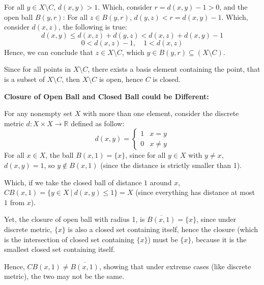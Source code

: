 \documentclass{article}
\begin{document}
For all $y\in X\setminus C$, $d(x,y)>1$. Which, consider $r=d(x,y)-1>0$, and the open ball $B(y,r)$:
For all $z\in B(y,r)$, $d(y,z) < r = d(x,y)-1$. Which, consider $d(x,z)$, the following is true:
$$d(x,y) \leq d(x,z)+d(y,z) < d(x,z)+d(x,y)-1$$
$$0 < d(x,z)-1,\quad 1<d(x,z)$$
Hence, we can conclude that $z\in X\setminus C$, which $y\in B(y,r)\subseteq (X\setminus C)$.

Since for all points in $X\setminus C$, there exists a basis element containing the point, that is a subset of $X\setminus C$,
then $X\setminus C$ is open, hence $C$ is closed.

\hfill

\textbf{Closure of Open Ball and Closed Ball could be Different:}

For any nonempty set $X$ with more than one element, consider the discrete metric $d:X\times X\rightarrow \mathbb{R}$ defined as follow:
$$d(x,y)=\begin{cases}
    1 & x=y\\
    0 & x\neq y
\end{cases}$$
For all $x\in X$, the ball $B(x,1)=\{x\}$, since for all $y\in X$ with $y\neq x$, $d(x,y)=1$, so $y \notin B(x,1)$ (since the distance is strictly smaller than 1).

Which, if we take the closed ball of distance $1$ around $x$, $CB(x,1)=\{y\in X\ |\ d(x,y)\leq 1\}=X$ (since everything has distance at most $1$ from $x$).

Yet, the closure of open ball with radius 1, is $\overline{B(x,1)}=\{x\}$, since under discrete metric,
$\{x\}$ is also a closed set containing itself, hence the closure (which is the intersection of closed set containing $\{x\}$) must be $\{x\}$,
because it is the smallest closed set containing itself.

Hence, $CB(x,1)\neq \overline{B(x,1)}$, showing that under extreme cases (like discrete metric), the two may not be the same.
\end{document}
